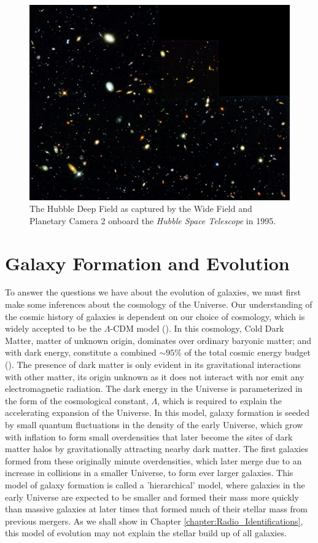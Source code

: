 \begin{figure}
    \centering
	\includegraphics[width=0.9\columnwidth]{Figures/hubble_deep_field.pdf}
	\caption[Hubble Deep Field as captured by the \textit{Hubble Space Telescope}]{The Hubble Deep Field as captured by the Wide Field and Planetary Camera 2 onboard the \textit{Hubble Space Telescope} in 1995.}
	\label{fig:hubble_deep_field}
\end{figure}

\section{Galaxy Formation and Evolution}

To answer the questions we have about the evolution of galaxies, we must first make some inferences about the cosmology of the Universe. Our understanding of the cosmic history of galaxies is dependent on our choice of cosmology, which is widely accepted to be the $\Lambda$-CDM model (\citealt{Peebles_1980}). In this cosmology, Cold Dark Matter, matter of unknown origin, dominates over ordinary baryonic matter; and with dark energy, constitute a combined $\sim 95\%$ of the total cosmic energy budget (\citealt{Fukugita_2004}). The presence of dark matter is only evident in its gravitational interactions with other matter, its origin unknown as it does not interact with nor emit any electromagnetic radiation. The dark energy in the Universe is parameterized in the form of the cosmological constant, $\Lambda$, which is required to explain the accelerating expansion of the Universe. In this model, galaxy formation is seeded by small quantum fluctuations in the density of the early Universe, which grow with inflation to form small overdensities that later become the sites of dark matter halos by gravitationally attracting nearby dark matter. The first galaxies formed from these originally minute overdensities, which later merge due to an increase in collisions in a smaller Universe, to form ever larger galaxies. This model of galaxy formation is called a 'hierarchical' model, where galaxies in the early Universe are expected to be smaller and formed their mass more quickly than massive galaxies at later times that formed much of their stellar mass from previous mergers. As we shall show in Chapter \ref{chapter:Radio_Identifications}, this model of evolution may not explain the stellar build up of all galaxies.

